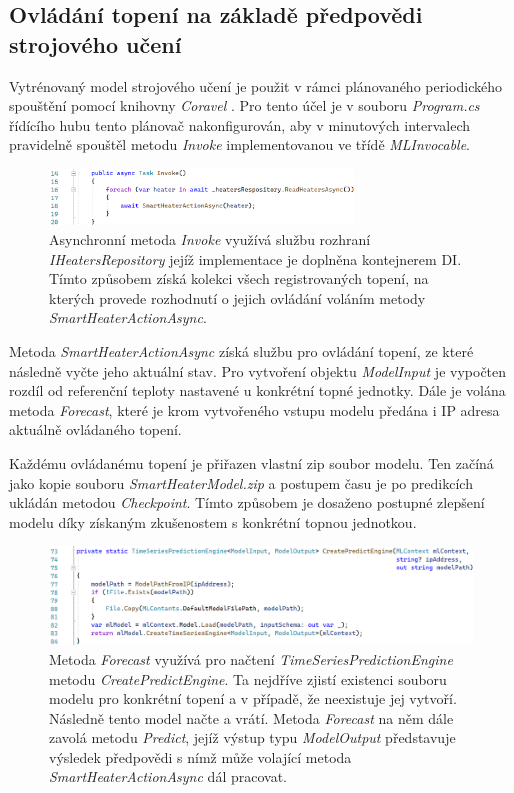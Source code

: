\pagebreak

\subsection{Ovládání topení na základě předpovědi strojového učení}
Vytrénovaný model strojového učení je použit v rámci plánovaného periodického spouštění pomocí knihovny {\it Coravel} \cite{coravel}. Pro tento účel je v souboru {\it Program.cs} řídícího hubu tento plánovač nakonfigurován, aby v minutových intervalech pravidelně spouštěl metodu {\it Invoke} implementovanou ve třídě {\it MLInvocable}.

\begin{figure}[hbt]
\includegraphics[width=0.72\textwidth]{obrazky-figures/code-invoke.png}
\caption{Asynchronní metoda {\it Invoke} využívá službu rozhraní {\it IHeatersRepository} jejíž implementace je doplněna kontejnerem DI. Tímto způsobem získá kolekci všech registrovaných topení, na kterých provede rozhodnutí o jejich ovládání voláním metody {\it SmartHeaterActionAsync}.}
\end{figure}

Metoda {\it SmartHeaterActionAsync} získá službu pro ovládání topení, ze které následně vyčte jeho aktuální stav. Pro vytvoření objektu {\it ModelInput} je vypočten rozdíl od referenční teploty nastavené u konkrétní topné jednotky. Dále je volána metoda {\it Forecast}, které je krom vytvořeného vstupu modelu předána i IP adresa aktuálně ovládaného topení.

Každému ovládanému topení je přiřazen vlastní zip soubor modelu. Ten začíná jako kopie souboru {\it SmartHeaterModel.zip} a postupem času je po predikcích ukládán metodou {\it Checkpoint}. Tímto způsobem je dosaženo postupné zlepšení modelu díky získaným zkušenostem s konkrétní topnou jednotkou.

\begin{figure}[hbt]
\includegraphics[width=\textwidth]{obrazky-figures/code-create-engine.png}
\caption{Metoda {\it Forecast} využívá pro načtení {\it TimeSeriesPredictionEngine} metodu {\it CreatePredictEngine}. Ta nejdříve zjistí existenci souboru modelu pro konkrétní topení a v případě, že neexistuje jej vytvoří. Následně tento model načte a vrátí. Metoda {\it Forecast} na něm dále zavolá metodu {\it Predict}, jejíž výstup typu {\it ModelOutput} představuje výsledek předpovědi s nímž může volající metoda {\it SmartHeaterActionAsync} dál pracovat.}
\end{figure}

